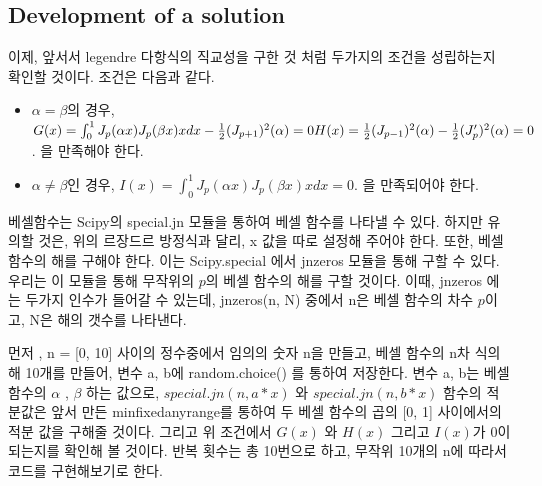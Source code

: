 \documentclass[11pt]{article}
\begin{document}
\subsection{Development of a solution} 
이제, 앞서서 legendre 다항식의 직교성을 구한 것 처럼 두가지의 조건을 성립하는지 확인할 것이다. 조건은 다음과 같다.
\begin{itemize}

\item$ \alpha = \beta$의 경우, \\
$G(x) =  \int_0^1 J_p(\alpha x) J_p(\beta x) x dx - \frac{1}{2} (J_{p + 1})^2(\alpha) = 0  \\
H(x) =  \frac{1}{2} (J_{p - 1})^2(\alpha) - \frac{1}{2} (J_p')^2(\alpha) = 0 $.  을 만족해야 한다.




\item $\alpha \neq \beta$인 경우,  $I(x) = \int_0^1 J_p(\alpha x) J_p(\beta x) x dx = 0$. 을 만족되어야 한다.
\end{itemize}

베셀함수는 Scipy의 special.jn 모듈을 통하여 베셀 함수를 나타낼 수 있다. 하지만 유의할 것은, 위의 르장드르 방정식과 달리, x 값을 따로 설정해 주어야 한다. 또한, 베셀 함수의 해를 구해야 한다. 이는 Scipy.special 에서 jn\textunderscore zeros 모듈을 통해 구할 수 있다. 우리는 이 모듈을 통해 무작위의 $p$의 베셀 함수의 해를 구할 것이다. 이때,  jn\textunderscore zeros 에는 두가지 인수가 들어갈 수 있는데, jn\textunderscore zeros(n, N) 중에서 n은 베셀 함수의 차수 $p$이고, N은 해의 갯수를 나타낸다.

먼저 , n = [0, 10] 사이의 정수중에서 임의의 숫자 n을 만들고, 베셀 함수의 n차 식의 해 10개를 만들어, 변수 a, b에 random.choice() 를 통하여 저장한다. 변수 a, b는 베셀 함수의 $\alpha$ , $\beta$ 하는 값으로,  
 $special.jn(n, a*x)$ 와 $ special.jn(n, b*x)$ 함수의 적분값은 앞서 만든 min\textunderscore fixed\textunderscore any\textunderscore range를 통하여 두 베셀 함수의 곱의 [0, 1] 사이에서의 적분 값을 구해줄 것이다. 그리고 위 조건에서 $G(x)$ 와 $H(x)$  그리고 $I(x)$가 0이 되는지를 확인해 볼 것이다. 반복 횟수는 총 10번으로 하고, 무작위 10개의 n에 따라서 코드를 구현해보기로 한다. 
\end{document}
